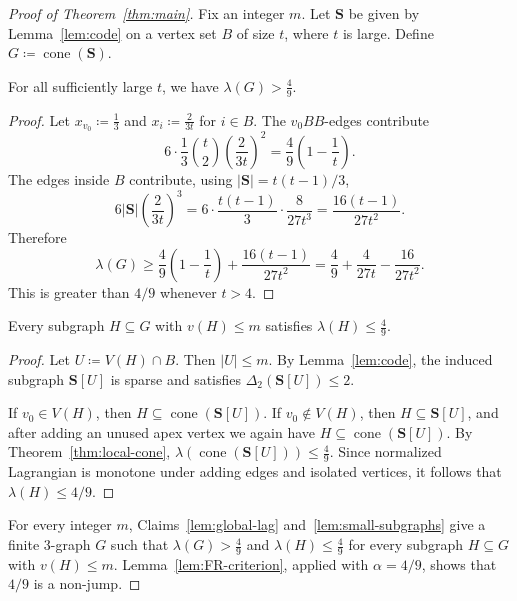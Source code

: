 \documentclass[10pt,a4paper]{amsart}
\newcommand{\La}{\lambda}
\newcommand{\Sint}{\mathbf{S}}
\newcommand{\cone}{\operatorname{cone}}
\begin{document}
\begin{proof}[Proof of Theorem~\ref{thm:main}]
Fix an integer $m$. Let $\Sint$ be given by Lemma~\ref{lem:code} on a vertex set $B$ of size $t$, where $t$ is large. Define $G \coloneqq \cone(\Sint)$.

\begin{claim}\label{lem:global-lag}
For all sufficiently large $t$, we have $\La(G)>\frac49$.
\end{claim}

\begin{proof}
Let $x_{v_0} \coloneqq \frac13$ and $x_i \coloneqq \frac{2}{3t}$ for $i \in B$. The $v_0BB$-edges contribute
\[
        6\cdot\frac13\binom t2\left(\frac{2}{3t}\right)^2
        =\frac49\left(1-\frac1t\right).
\]
The edges inside $B$ contribute, using $|\Sint|=t(t-1)/3$,
\[
        6|\Sint|\left(\frac{2}{3t}\right)^3
        =6\cdot\frac{t(t-1)}3\cdot\frac{8}{27t^3}
        =\frac{16(t-1)}{27t^2}.
\]
Therefore
\[
        \La(G)
        \ge
        \frac49\left(1-\frac1t\right)+\frac{16(t-1)}{27t^2}
        =\frac49+\frac4{27t}-\frac{16}{27t^2}.
\]
This is greater than $4/9$ whenever $t>4$.
\end{proof}


\begin{claim}\label{lem:small-subgraphs}
Every subgraph $H\subseteq G$ with $v(H)\le m$ satisfies $\La(H)\le \frac49$.
\end{claim}

\begin{proof}
Let $U \coloneqq V(H)\cap B$. Then $|U|\le m$. By Lemma~\ref{lem:code}, the induced subgraph $\Sint[U]$ is sparse and satisfies $\Delta_2(\Sint[U])\le2$.

If $v_0\in V(H)$, then $H\subseteq \cone(\Sint[U])$. If $v_0\notin V(H)$, then $H\subseteq \Sint[U]$, and after adding an unused apex vertex we again have $H\subseteq \cone(\Sint[U])$. By Theorem~\ref{thm:local-cone}, $\La(\cone(\Sint[U]))\le\frac49$. Since normalized Lagrangian is monotone under adding edges and isolated vertices, it follows that $\La(H)\le4/9$.
\end{proof}


For every integer $m$, Claims~\ref{lem:global-lag} and~\ref{lem:small-subgraphs} give a finite $3$-graph $G$ such that $\La(G)>\frac49$ and $\La(H)\le\frac49$ for every subgraph $H\subseteq G$ with $v(H)\le m$. Lemma~\ref{lem:FR-criterion}, applied with $\alpha=4/9$, shows that $4/9$ is a non-jump.
\end{proof}
\end{document}
